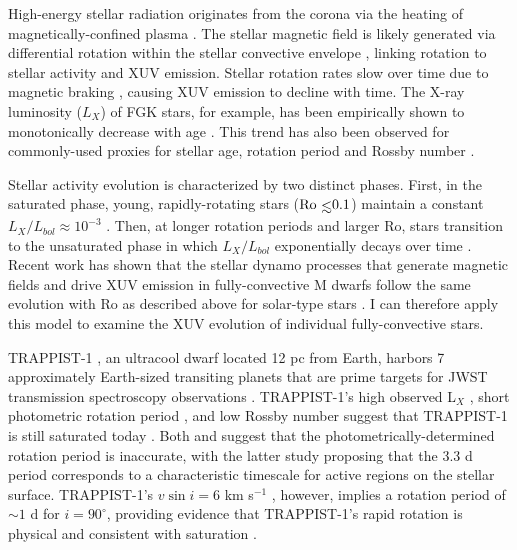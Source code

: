High-energy stellar radiation originates from the corona via the heating of magnetically-confined plasma \citep{Vaiana1981}. The stellar magnetic field is likely generated via differential rotation within the stellar convective envelope \citep{Parker1955}, linking rotation to stellar activity and XUV emission. Stellar rotation rates slow over time due to magnetic braking \citep{Skumanich1972}, causing XUV emission to decline with time. The X-ray luminosity ($L_{X}$) of FGK stars, for example, has been empirically shown to monotonically decrease with age \citep{Jackson2012}. This trend has also been observed for commonly-used proxies for stellar age, rotation period and Rossby number \citep[Ro = $P_{rot}/\tau$ for convective turnover timescale $\tau$,][]{Pizzolato2003,Wright2011}. 

Stellar activity evolution is characterized by two distinct phases. First, in the saturated phase, young, rapidly-rotating stars ($\mathrm{Ro}\lsim 0.1$) maintain a constant $L_{X}/L_{bol} \approx 10^{-3}$ \citep{Wright2011,Jackson2012}. Then, at longer rotation periods and larger Ro, stars transition to the unsaturated phase in which $L_{X}/L_{bol}$ exponentially decays over time \citep{Pizzolato2003,Ribas2005}. Recent work has shown that the stellar dynamo processes that generate magnetic fields and drive XUV emission in fully-convective M dwarfs follow the same evolution with Ro as described above for solar-type stars \citep{Wright2016,Wright2018}. I can therefore apply this model to examine the XUV evolution of individual fully-convective stars.

TRAPPIST-1 \citep{Gillon2016,Gillon2017}, an ultracool dwarf located 12 pc from Earth, harbors 7 approximately Earth-sized transiting planets that are prime targets for JWST transmission spectroscopy observations \citep{Morley2017,Lincowski2018,Lustig2019}. TRAPPIST-1's high observed L$_{X}$ \citep{Wheatley2017}, short photometric rotation period \citep[3.3 d, ][]{Luger2017}, and low Rossby number \citep[Ro $\approx 0.01$, ][]{Roettenbacher2017} suggest that TRAPPIST-1 is still saturated today \citep{Pizzolato2003,Wright2011,Wright2018}. Both \citet{Roettenbacher2017} and \citet{Morris2018} suggest that the photometrically-determined rotation period is inaccurate, with the latter study proposing that the 3.3 d period corresponds to a characteristic timescale for active regions on the stellar surface. TRAPPIST-1's $v \sin i = 6$ km s$^{-1}$ \citep{Barnes2014}, however, implies a rotation period of ${\sim}1$ d for $i = 90^{\circ}$, providing evidence that TRAPPIST-1's rapid rotation is physical and consistent with saturation \citep[$P_{rot} \lsim 20$ d,][]{Wright2018}. 

